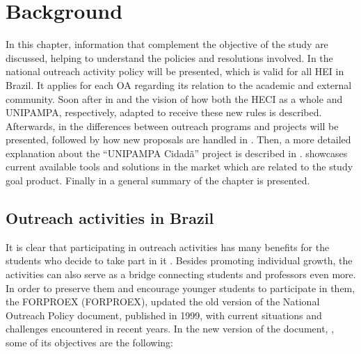 \chapter{Background}\label{background}

In this chapter, information that complement the objective of the study are discussed, helping to understand the policies and resolutions involved. In  the national outreach activity policy will be presented, which is valid for all \ac{HEI} in Brazil. It applies for each \ac{OA} regarding its relation to the academic and external community. Soon after in  and  the vision of how both the \ac{HECI} as a whole and \acl{UNIPAMPA}, respectively, adapted to receive these new rules is described. Afterwards, in  the differences between outreach programs and projects will be presented, followed by how new proposals are handled in . Then, a more detailed explanation about the ``\ac{UNIPAMPA} Cidadã'' project is described in .  showcases current available tools and solutions in the market which are related to the study goal product. Finally in  a general summary of the chapter is presented.

\section{Outreach activities in Brazil}\label{sec:bac-outreach-brazil}

It is clear that participating in outreach activities has many benefits for the students who decide to take part in it \cite{sellou2011many}. Besides promoting individual growth, the activities can also serve as a bridge connecting students and professors even more. In order to preserve them and encourage younger students to participate in them, the \acl{FORPROEX} (\ac{FORPROEX}), updated the old version of the National Outreach Policy document, published in 1999, with current situations and challenges encountered in recent years. In the new version of the document, \cite{politicaNacional}, some of its objectives are the following:

